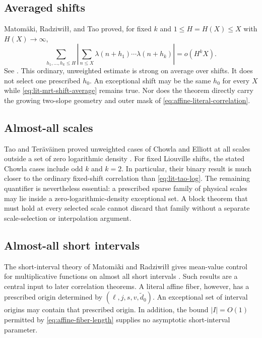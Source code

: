 \subsection{Averaged shifts}

Matom\"aki, Radziwi{\l}{\l}, and Tao proved, for fixed \(k\) and
\(1\le H=H(X)\le X\) with \(H(X)\to\infty\),
\begin{equation}
 \sum_{h_1,\ldots,h_k\le H}
 \left|
 \sum_{n\le X}
 \lambda(n+h_1)\cdots\lambda(n+h_k)
 \right|
 =o(H^kX).
 \label{eq:lit-mrt-shift-average}
\end{equation}
See \citet{MatomakiRadziwillTao2015}.  This ordinary, unweighted
estimate is strong on average over shifts.  It does not select one
prescribed \(h_0\).  An exceptional shift may be the same \(h_0\) for
every \(X\) while \eqref{eq:lit-mrt-shift-average} remains true.
Nor does the theorem directly carry the growing two-slope geometry
and outer mask of \eqref{eq:affine-literal-correlation}.

\subsection{Almost-all scales}

Tao and Ter\"av\"ainen proved unweighted cases of Chowla and Elliott
at all scales outside a set of zero logarithmic density
\citep{TaoTeravainen2019}.  For fixed Liouville shifts, the stated
Chowla cases include odd \(k\) and \(k=2\).  In particular, their
binary result is much closer to the ordinary fixed-shift correlation than
\eqref{eq:lit-tao-log}.  The remaining quantifier is nevertheless
essential: a prescribed sparse family of physical scales may lie
inside a zero-logarithmic-density exceptional set.  A block theorem
that must hold at every selected scale cannot discard that family
without a separate scale-selection or interpolation argument.

\subsection{Almost-all short intervals}

The short-interval theory of Matom\"aki and Radziwi{\l}{\l} gives
mean-value control for multiplicative functions on almost all short
intervals \citep{MatomakiRadziwill2016}.  Such results are a central
input to later correlation theorems.  A literal affine fiber,
however, has a prescribed origin determined by
\((\ell,j,s,v,\widetilde d_0)\).  An exceptional set of interval
origins may contain that prescribed origin.  In addition, the bound
\(|I|=O(1)\) permitted by \eqref{eq:affine-fiber-length} supplies no
asymptotic short-interval parameter.


